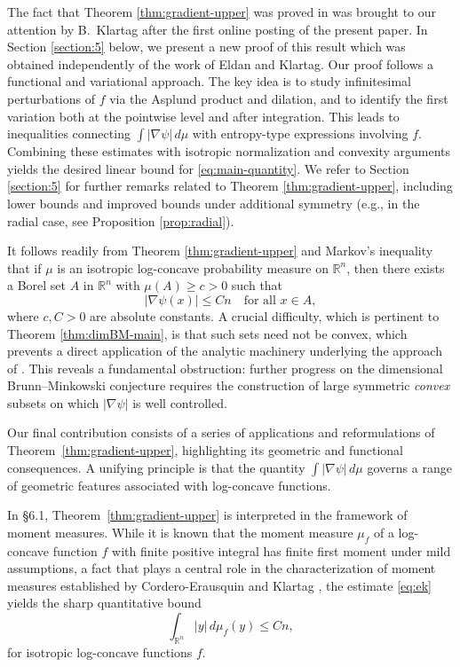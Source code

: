\documentclass[11pt,leqno]{article}
\theoremstyle{definition}
\theoremstyle{remark}
\numberwithin{equation}{section}
\newcommand{\ls}{\leqslant}
\newcommand{\gr}{\geqslant}
\newcommand{\1}{\textbf{1}}
\begin{document}
The fact that Theorem \ref{thm:gradient-upper} was proved in \cite{EK08} was brought to our attention by B.~Klartag after the first online posting of the present paper. In Section \ref{section:5} below, we present a new proof of this result which was obtained independently of the work of Eldan and Klartag. Our proof follows a functional and variational approach. The key idea is to study infinitesimal perturbations of $f$ via the Asplund product and dilation, and to identify the first variation both at the pointwise level and after integration. This leads to inequalities connecting $\int |\nabla \psi|\,d\mu$ with entropy-type expressions involving $f$. Combining these estimates with isotropic normalization and convexity arguments yields the desired linear bound for \eqref{eq:main-quantity}. We refer to Section \ref{section:5} for further remarks related to Theorem \ref{thm:gradient-upper}, including lower bounds and improved bounds under additional symmetry (e.g., in the radial case, see Proposition \ref{prop:radial}).


\smallskip

It follows readily from Theorem \ref{thm:gradient-upper} and Markov's inequality that if $\mu$ is an isotropic log-concave probability measure on $\mathbb{R}^n$, then there exists a Borel set $A$ in $\mathbb{R}^n$ with $\mu(A)\gr c>0$ such that
$$|\nabla\psi(x)| \ls Cn \quad \text{for all } x\in A,$$
where $c,C>0$ are absolute constants. A crucial difficulty, which is pertinent to Theorem \ref{thm:dimBM-main}, is that such sets need not be convex, which prevents a direct application of the analytic machinery underlying the approach of \cite{Livshyts-2023}. This reveals a fundamental obstruction: further progress on the dimensional Brunn--Minkowski conjecture requires the construction of large symmetric \emph{convex} subsets on which $|\nabla\psi|$ is well controlled.

\medskip

Our final contribution consists of a series of applications and reformulations of Theorem~\ref{thm:gradient-upper}, highlighting its geometric and functional consequences. A unifying principle is that the quantity $\int |\nabla\psi|\,d\mu$ governs a range of geometric features associated with log-concave functions.

In \S 6.1, Theorem~\ref{thm:gradient-upper} is interpreted in the framework of moment measures. While it is known that the moment measure $\mu_f$ 
of a log-concave function $f$ with finite positive integral has finite first moment under mild assumptions, a fact that plays 
a central role in the characterization of moment measures established by Cordero-Erausquin and Klartag \cite{Cordero-Klartag-2015}, the estimate \eqref{eq:ek} yields 
the sharp quantitative bound
$$\int_{\mathbb{R}^n} |y|\,d\mu_f(y) \ls Cn,$$
for isotropic log-concave functions $f$. 
\end{document}
